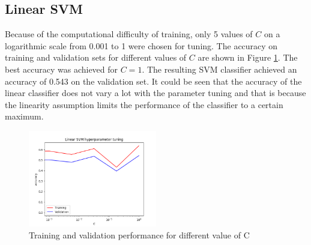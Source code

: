 \documentclass[letterpaper, 10 pt, conference]{ieeeconf}  %
\begin{document}
\subsection{Linear SVM}
Because of the computational difficulty of training, only 5 values of $C$ on a logarithmic scale from 0.001 to 1 were chosen for tuning. The accuracy on training and validation sets for different values of $C$ are shown in Figure \ref{fig:svmtuning}. The best accuracy was achieved for $C=1$. The resulting SVM classifier achieved an accuracy of 0.543 on the validation set. It could be seen that the accuracy of the linear classifier does not vary a lot with the parameter tuning and that is because the linearity assumption limits the performance of the classifier to a certain maximum.
\begin{figure}[h]
	\begin{center}
		\includegraphics[width=0.5\textwidth]{figures/svm_tuning.png}  %
		\caption{Training and validation performance for different value of C}
		\label{fig:svmtuning}
	\end{center}
\end{figure}
\end{document}
